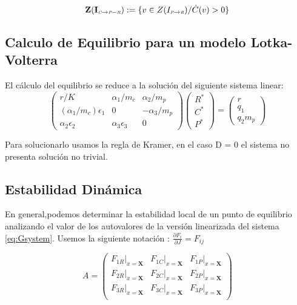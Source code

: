 \begin{equation}
\mathbf{Z(I_{\textit{\tiny C} \to \textit{\tiny P}-\textit{\tiny R}})} := \{v \in Z(I_{\textit{\tiny P} \to \textit{\tiny R}}) / \dot{C}(v) > 0\}
\end{equation}


\subsection{Calculo de Equilibrio para un modelo Lotka-Volterra}\label{subsec:equil}
El c\'alculo del equilibrio se reduce a la soluci\'on del siguiente sistema linear:
\begin{equation}
\begin{pmatrix}
r/K & \alpha_1/m_c & \alpha_2/m_p \\
(\alpha_1/m_c)\epsilon_1& 0 & -\alpha_3/m_p \\
\alpha_2 \epsilon_2 & \alpha_3 \epsilon_3 & 0
\end{pmatrix}
\begin{pmatrix}
R^* \\
C^* \\
P^* 
\end{pmatrix}
=
\begin{pmatrix}
r \\
q_1 \\
q_2 m_p
\end{pmatrix}
\end{equation}

Para solucionarlo usamos la regla de Kramer, en el caso D = 0 el sistema no presenta soluci\'on no trivial.

\subsection{Estabilidad Din\'amica}\label{subsec:stab}
En general,podemos determinar la estabilidad local de un punto de equilibrio analizando el valor de los autovalores de la versi\'on linearizada del sistema \eqref{eq:Gsystem}. \citep{yodzis1989introduction}
Usemos la siguiente notaci\'on : $ \frac{\partial F_i}{\partial J} = F_{ij} $

\begin{equation} \label{eq:linver}
A = \begin{pmatrix}
\left. F_{1R} \right|_{x=\mathbf{X}}& \left.F_{1C}\right|_{x=\mathbf{X}}&\left.F_{1P}\right|_{x=\mathbf{X}}\\
\left. F_{2R}\right|_{x=\mathbf{X}}& \left.F_{2C}\right|_{x=\mathbf{X}}&\left.F_{2P}\right|_{x=\mathbf{X}}\\
\left. F_{3R}\right|_{x=\mathbf{X}}& \left.F_{3C}\right|_{x=\mathbf{X}}&\left.F_{3P}\right|_{x=\mathbf{X}}\\
\end{pmatrix}
\end{equation}


